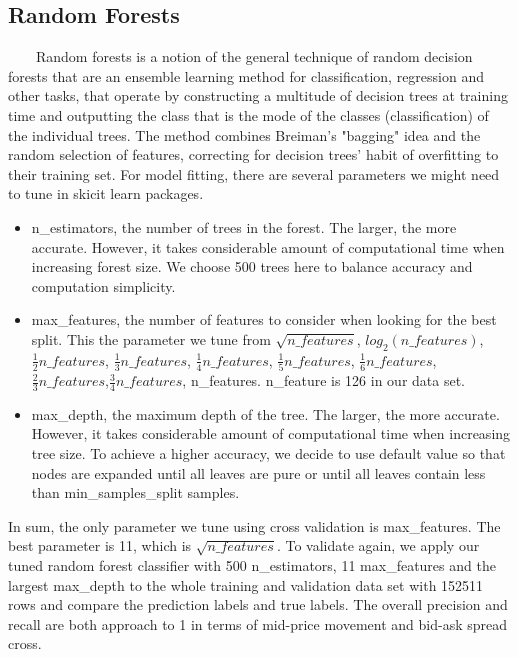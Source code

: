 \documentclass[11pt]{article}
\begin{document}
\subsection{Random Forests}
\ \ \ \ Random forests is a notion of the general technique of random decision forests that are an ensemble learning method for classification, regression and other tasks, that operate by constructing a multitude of decision trees at training time and outputting the class that is the mode of the classes (classification) of the individual trees. The method combines Breiman's "bagging" idea and the random selection of features, correcting for decision trees' habit of overfitting to their training set\cite{rf}. For model fitting, there are several parameters we might need to tune in skicit learn packages. 
\begin{itemize}
\item n\_estimators, the number of trees in the forest. The larger, the more accurate. However, it takes considerable amount of computational time when increasing forest size. We choose 500 trees here to balance accuracy and computation simplicity.
\item max\_features, the number of features to consider when looking for the best split. This the parameter we tune from $\sqrt{n\_features}$, $log_2{(n\_features)}$, $\frac{1}{2}{n\_features}$, $\frac{1}{3}{n\_features}$, $\frac{1}{4}{n\_features}$, $\frac{1}{5}{n\_features}$, $\frac{1}{6}{n\_features}$, $\frac{2}{3}{n\_features}$,$\frac{3}{4}{n\_features}$, n\_features. n\_feature is 126 in our data set.
\item max\_depth, the maximum depth of the tree. The larger, the more accurate. However, it takes considerable amount of computational time when increasing tree size. To achieve a higher accuracy, we decide to use default value so that nodes are expanded until all leaves are pure or until all leaves contain less than min\_samples\_split samples.
\end{itemize}
\par
In sum, the only parameter we tune using cross validation is max\_features. The best parameter is 11, which is $\sqrt{n\_features}$. To validate again, we apply our tuned random forest classifier with 500 n\_estimators, 11 max\_features and the largest max\_depth to the whole training and validation data set with 152511 rows and compare the prediction labels and true labels. The overall precision and recall are both approach to 1 in terms of mid-price movement and bid-ask spread cross.
\end{document}
